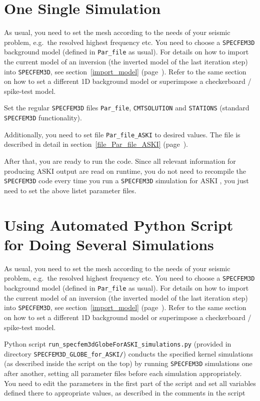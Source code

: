\documentclass[12pt,a4paper]{article}
\newcommand{\lcode}[1]{\nolinkurl{#1}}
\newcommand{\ASKI}{ {\ttfamily ASKI} }
\newcommand{\myref}[1]{\ref{#1} (page~\pageref{#1})}
\begin{document}
\section{One Single Simulation} \label{no_script}
%
As usual, you need to set the mesh according to the needs of your seismic problem, e.g.\ the
resolved highest frequency etc. You need to choose a \lcode{SPECFEM3D} background model (defined
in \lcode{Par_file} as usual). For details on how to import the current model of an inversion 
(the inverted model of the last iteration step) into \lcode{SPECFEM3D}, see section~\myref{import_model}.
Refer to the same section on how to set a different 1D background model or superimpose a 
checkerboard / spike-test model.

Set the regular \lcode{SPECFEM3D} files \lcode{Par_file}, \lcode{CMTSOLUTION} 
and \lcode{STATIONS} (standard \lcode{SPECFEM3D} functionality).

Additionally, you need to set file \lcode{Par_file_ASKI} to desired values. The file is described 
in detail in section~\myref{file_Par_file_ASKI}. 

After that, you are ready to run the code. Since all relevant information for producing \ASKI{} output 
are read on runtime, you do not need to recompile the \lcode{SPECFEM3D} code every time you
run a \lcode{SPECFEM3D} simulation for \ASKI{}, you just need to set the above listet parameter files.
%
\section{Using Automated Python Script for Doing Several Simulations} \label{use_script}
%
As usual, you need to set the mesh according to the needs of your seismic problem, e.g.\ the
resolved highest frequency etc. You need to choose a \lcode{SPECFEM3D} background model (defined
in \lcode{Par_file} as usual). For details on how to import the current model of an inversion 
(the inverted model of the last iteration step) into \lcode{SPECFEM3D}, see section~\myref{import_model}.
Refer to the same section on how to set a different 1D background model or superimpose a 
checkerboard / spike-test model.

Python script \lcode{run_specfem3dGlobeForASKI_simulations.py} (provided in directory 
\lcode{SPECFEM3D_GLOBE_for_ASKI/}) conducts the specified 
kernel simulations (as described inside the script on the top) by running 
\lcode{SPECFEM3D} simulations one after another, setting all parameter files before each simulation appropriately.
You need to edit the parameters in the first part of the script and set all variables defined 
there to appropriate values, as described in the comments in the script 
\end{document}
